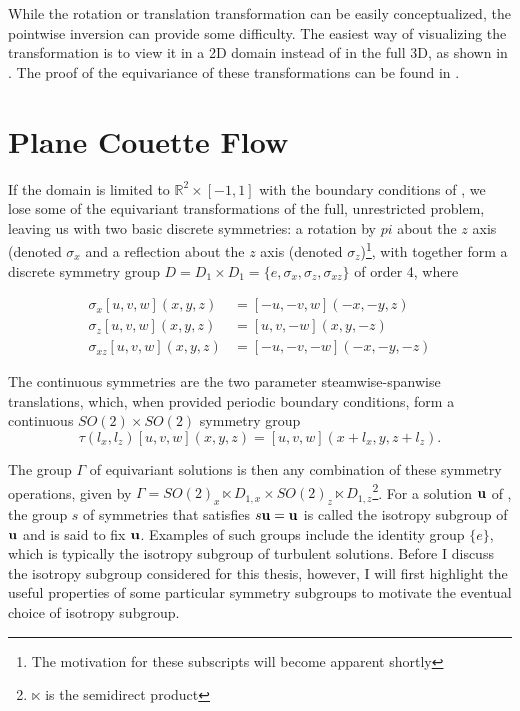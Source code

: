 While the rotation or translation transformation can be easily conceptualized, the pointwise inversion can provide some difficulty. The easiest way of visualizing the transformation is to view it in a 2D domain instead of in the full 3D, as shown in . The proof of the equivariance of these transformations can be found in \cite{a}.



\section{Plane Couette Flow}

If the domain is limited to $\mathbb{R}^2 \times [-1,1]$ with the boundary conditions of \pCf, we lose some of the equivariant transformations of the full, unrestricted problem, leaving us with two basic discrete symmetries: a rotation by $pi$ about the $z$ axis (denoted $\sigma_x$ and a reflection about the $z$ axis (denoted $\sigma_z$)\footnote{The motivation for these subscripts will become apparent shortly}, with together form a discrete symmetry group $D = D_1 \times D_1 = \{e, \sigma_x,\sigma_z,\sigma_{xz}\}$ of order 4, where

\begin{align}\label{eq:discretesymm}
\sigma_x [u,v,w](x,y,z) &= [-u,-v,w](-x,-y,z)\\
\sigma_z [u,v,w](x,y,z) &= [u,v,-w](x,y,-z)\\
\sigma_{xz} [u,v,w](x,y,z) &= [-u,-v,-w](-x,-y,-z)
\end{align}

The continuous symmetries are the two parameter steamwise-spanwise translations, which, when provided periodic boundary conditions, form a continuous $SO(2)\times SO(2)$ symmetry group 
\begin{equation}\label{eq:contsymm}
\tau(l_x,l_z)[u,v,w](x,y,z) = [u,v,w](x+l_x,y,z+l_z).
\end{equation}

The group $\Gamma$ of equivariant solutions is then any combination of these symmetry operations, given by $\Gamma = SO(2)_x \ltimes D_{1,x} \times SO(2)_z \ltimes D_{1,z}$\footnote{$\ltimes$ is the semidirect product}. For a solution $\mathbf{u}$ of \pCf, the group $s$ of symmetries that satisfies $s\mathbf{u} = \mathbf{u}$ is called the isotropy subgroup of $\mathbf{u}$ and is said to fix $\mathbf{u}$. Examples of such groups include the identity group $\{e\}$, which is typically the isotropy subgroup of turbulent solutions. Before I discuss the isotropy subgroup considered for this thesis, however, I will first highlight the useful properties of some particular symmetry subgroups to motivate the eventual choice of isotropy subgroup. 

